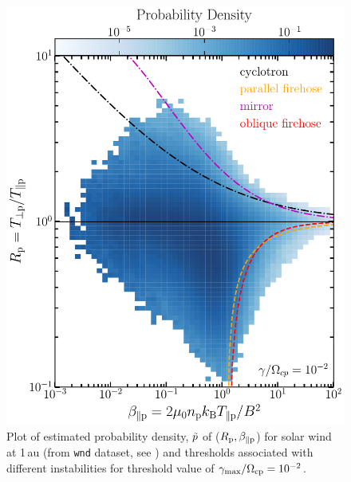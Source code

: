         \begin{figure}
            \begin{center}
                \includegraphics[width=1\textwidth]{figures/chap2/brazil_prob_wnd.pdf}
                \caption[Brazil-plot at 1\,au]{Plot of estimated probability density, $\Tilde{p}$ of
                ($R_{\rm p}, \beta_{\parallel \rm p}$) for solar wind at 1\,au (from \texttt{wnd}
                dataset, see ) and thresholds associated with different
                instabilities for threshold value of $\gamma_{\max}/\Omega_{\rm cp} = 10^{-2}$.}
                \label{fig:brazil_prob_wnd}
            \end{center}
        \end{figure}
